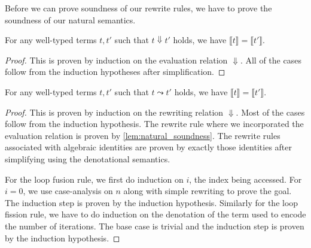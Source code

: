 Before we can prove soundness of our rewrite rules, we have to prove the soundness of our natural semantics.

\begin{lemma}\label{lem:natural_soundness}
  For any well-typed terms $t, t'$ such that $t \Downarrow t'$ holds, we have $\llbracket t \rrbracket = \llbracket t' \rrbracket$.
\end{lemma}
\begin{proof}
  This is proven by induction on the evaluation relation $\Downarrow$.
  All of the cases follow from the induction hypotheses after simplification.
\end{proof}

\begin{theorem}
  For any well-typed terms $t, t'$ such that $t \leadsto t'$ holds, we have $\llbracket t \rrbracket = \llbracket t' \rrbracket$.
\end{theorem}
\begin{proof}
  This is proven by induction on the rewriting relation $\Downarrow$.
  Most of the cases follow from the induction hypothesis.
  The rewrite rule where we incorporated the evaluation relation is proven by \cref{lem:natural_soundness}.
  The rewrite rules associated with algebraic identities are proven by exactly those identities after simplifying using the denotational semantics.

  For the loop fusion rule, we first do induction on $i$, the index being accessed.
  For $i = 0$, we use case-analysis on $n$ along with simple rewriting to prove the goal. The induction step is proven by the induction hypothesis.
  Similarly for the loop fission rule, we have to do induction on the denotation of the term used to encode the number of iterations.
  The base case is trivial and the induction step is proven by the induction hypothesis.
\end{proof}